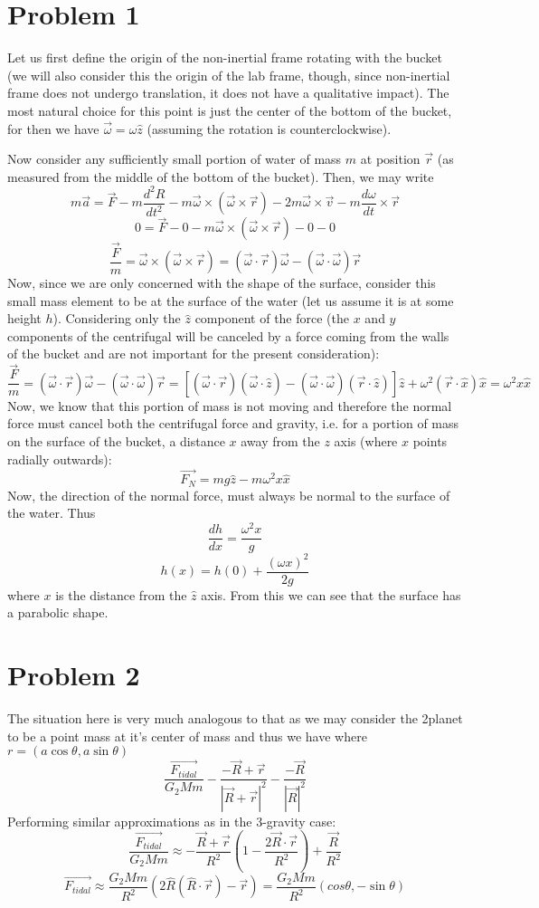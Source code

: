 
\section*{Problem 1}
Let us first define the origin of the non-inertial frame rotating with the bucket (we will also consider this the origin of the lab frame, though, since non-inertial frame does not undergo translation, it does not have a qualitative impact). The most natural choice for this point is just the center of the bottom of the bucket, for then we have $\vec{\omega} = \omega\hat{z}$ (assuming the rotation is counterclockwise). \par Now consider any sufficiently small portion of water of mass $m$ at position $\vec{r}$ (as measured from the middle of the bottom of the bucket). Then, we may write
\[ m\vec{a} = \vec{F} - m\frac{d^2R}{dt^2} - m\vec{\omega}\times(\vec{\omega}\times\vec{r}) - 2m\vec{\omega}\times \vec{v}-m\frac{d\omega}{dt}\times \vec{r} \]
\[ 0 = \vec{F} -  0 - m\vec{\omega}\times(\vec{\omega}\times\vec{r})  - 0 - 0\]
\[ \frac{\vec{F}}{m} = \vec{\omega}\times(\vec{\omega}\times\vec{r}) = (\vec{\omega} \cdot \vec{r}) \vec{\omega}  - (\vec{\omega}\cdot\vec{\omega})\vec{r} \]
Now, since we are only concerned with the shape of the surface, consider this small mass element to be at the surface of the water (let us assume it is at some height $h$). Considering only the $\hat{z}$ component of the force (the $x$ and $y$ components of the centrifugal will be canceled by a force coming from the walls of the bucket and are not important for the present consideration):
\[  \frac{\vec{F}}{m} = (\vec{\omega}\cdot\vec{r})\vec{\omega}-(\vec{\omega}\cdot\vec{\omega})\vec{r} = 
\left[(\vec{\omega}\cdot\vec{r})(\vec{\omega}\cdot \hat{z})-(\vec{\omega}\cdot\vec{\omega})(\vec{r}\cdot\hat{z})\right]\hat{z} + \omega^2(\vec{r}\cdot \hat{x}) \hat{x} = \omega^2 x \hat{x} \]
Now, we know that this portion of mass is not moving and therefore the normal force must cancel both the centrifugal force and gravity, i.e. for a portion of mass on the surface of the bucket, a distance $x$ away from the $z$ axis (where $\hat{x}$ points radially outwards):
\[ \vec{F_N} = mg\hat{z} - m \omega^2 x \hat{x} \]
Now, the direction of the normal force, must always be normal to the surface of the water. Thus 
\[ \frac{dh}{dx} = \frac{\omega^2x}{g} \]
\[ h(x) = h(0) + \frac{(\omega x)^2}{2g} \]
where $x$ is the distance from the $\hat{z}$ axis. From this we can see that the surface has a parabolic shape.
\section*{Problem 2}
The situation here is very much analogous to that as we may consider the 2planet to be a point mass at it's center of mass and thus we have where $r=(a\cos\theta, a\sin\theta)$
\[ \frac{\vec{F_{tidal}}}{G_2Mm} - \frac{-\vec{R}+\vec{r}}{|\vec{R}+\vec{r}|^2}-\frac{-\vec{R}}{|\vec{R}|^2} \]
Performing similar approximations as in the 3-gravity case:
\[ \frac{\vec{F_{tidal}}}{G_2Mm} \approx -\frac{\vec{R}+\vec{r}}{R^2}\left(1-\frac{2\vec{R}\cdot\vec{r}}{R^2}\right)+\frac{\vec{R}}{R^2}\]
\[ \vec{F_{tidal}} \approx \frac{G_2Mm}{R^2}(2\hat{R}(\hat{R}\cdot \vec{r}) - \vec{r}) = \frac{G_2Mm}{R^2} (cos\theta,-\sin\theta) \]
